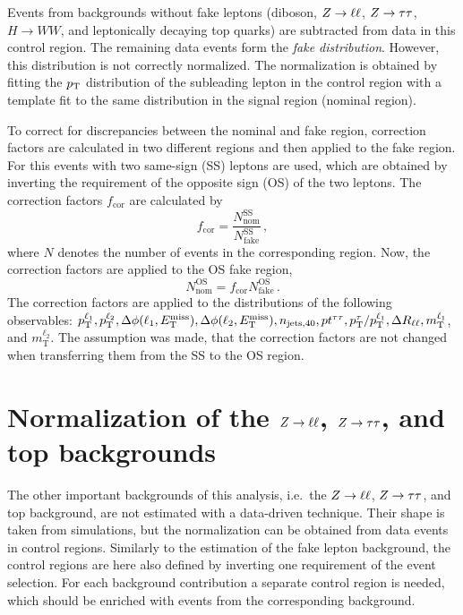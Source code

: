 Events from backgrounds without fake leptons (diboson, $Z \to \ell \ell$, $Z \to \tau \tau$, $H\to WW$, and leptonically decaying top quarks) are subtracted from data in this control region.
The remaining data events form the  \emph{fake distribution}.
However, this distribution is not correctly normalized.
The normalization is obtained by fitting the $p_\text{T}$ distribution of the subleading lepton in the control region
with a template fit to the same distribution in the signal region (nominal region).

To correct for discrepancies between the nominal and fake region, correction factors are calculated in two different regions
and then applied to the fake region.
For this events with two same-sign (SS) leptons are used, which are obtained by inverting the requirement of the opposite sign (OS)
of the two leptons.
The correction factors $f_\text{cor}$ are calculated by
\begin{equation}
    f_\text{cor} = \frac{N^\text{SS}_\text{nom}}{N^\text{SS}_\text{fake}} \,,
\end{equation}
where $N$ denotes the number of events in the corresponding region.
Now, the correction factors are applied to the OS fake region,
\begin{equation}
    N^\text{OS}_\text{nom} = f_\text{cor} N^\text{OS}_\text{fake} \,.
\end{equation}
The correction factors are applied to the distributions of the following observables:
$p_\text{T}^{\ell_1}, p_\text{T}^{\ell_2}, \Delta \phi (\ell_1, E_\text{T}^\text{miss}), \Delta \phi (\ell_2, E_\text{T}^\text{miss}), n_{\text{jets},40}, pt^{\tau\tau}, p_\text{T}^\tau / p_\text{T}^{\ell_1}, \Delta R_{\ell\ell}, m_\text{T}^{\ell_1}$, and $m_\text{T}^{\ell_2}$.
The assumption was made, that the correction factors are not changed when transferring them from the SS to the OS region.

\section{Normalization of the $Z \to \ell \ell$, $Z \to \tau \tau$, and top backgrounds}\label{sec:background_estimation:normalization}

The other important backgrounds of this analysis, i.e.\ the $Z \to \ell \ell$, $Z \to \tau \tau$, and top background, are not estimated with
a data-driven technique.
Their shape is taken from simulations, but the normalization can be obtained from data events in control regions.
Similarly to the estimation of the fake lepton background, the control regions are here also defined by inverting one requirement of the event selection.
For each background contribution a separate control region is needed, which should be enriched with events from the corresponding background.

